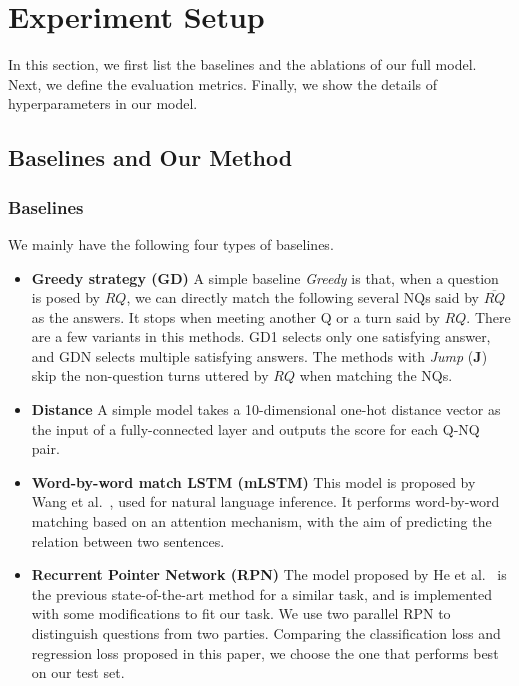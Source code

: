 \section{Experiment Setup}
\label{sec:eval}

In this section, we first list the baselines and the ablations of our full model. Next, we define the evaluation metrics. Finally, we show the details of hyperparameters in our model.

\subsection{Baselines and Our Method}

\subsubsection{Baselines} 
We mainly have the following four types of baselines.
\begin{itemize}
\item\textbf{Greedy strategy (GD)}
A simple baseline \textit{Greedy} is that, when a question is posed by $RQ$, we can directly match the following several NQs said by $\overline{RQ}$ as the answers. It stops when meeting another Q or a turn said by $RQ$. 
There are a few variants in this methods. GD1 selects only one satisfying answer, 
and GDN selects multiple satisfying answers. The methods with \textit{Jump} 
(\textbf{J}) skip the non-question turns uttered by $RQ$ when matching the 
NQs. 


\item\textbf{Distance}
A simple model takes a 10-dimensional one-hot distance vector as the input of a fully-connected layer and outputs the score for each Q-NQ pair.  


\item\textbf{Word-by-word match LSTM (mLSTM)}
This model is proposed by Wang et al.~\cite{wang2016learning}, used for natural language inference. It performs word-by-word matching based on an attention mechanism, with the aim of predicting the relation between two sentences.


\item \textbf{Recurrent Pointer Network (RPN)}
The model proposed by He et al.~\cite{he2019learning} is the previous
state-of-the-art method for a similar task, and is implemented with some modifications to fit our task. We use two parallel RPN to distinguish questions from two parties. Comparing the classification loss and regression loss proposed in this paper, we choose the one that performs best on our test set.

\end{itemize}

